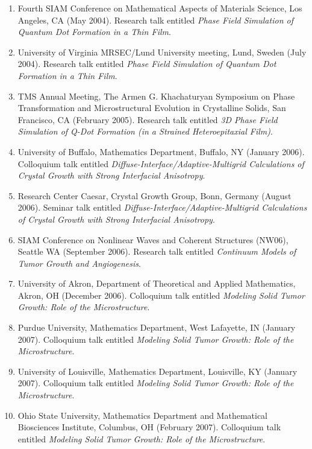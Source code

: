 \documentclass[10pt,letterpaper]{article}
\begin{document}
    \begin{enumerate}
    \item
Fourth SIAM Conference on Mathematical Aspects of Materials Science, Los Angeles, CA (May 2004). Research talk entitled {\sl Phase Field Simulation of Quantum Dot Formation in a Thin Film}.
    \item
University of Virginia MRSEC/Lund University meeting, Lund, Sweden (July 2004). Research talk entitled {\sl Phase Field Simulation of Quantum Dot Formation in a Thin Film}.
    \item
TMS Annual Meeting, The Armen G. Khachaturyan Symposium on Phase Transformation and Microstructural Evolution in Crystalline Solids, San Francisco, CA (February 2005).  Research talk entitled {\sl 3D Phase Field Simulation of Q-Dot Formation (in a Strained Heteroepitaxial Film)}.
    \item
University of Buffalo, Mathematics Department, Buffalo, NY (January 2006).  Colloquium talk entitled {\sl Diffuse-Interface/Adaptive-Multigrid Calculations of Crystal Growth with Strong Interfacial Anisotropy}.
    \item
Research Center Caesar, Crystal Growth Group, Bonn, Germany (August 2006).  Seminar talk entitled {\sl Diffuse-Interface/Adaptive-Multigrid Calculations of Crystal Growth with Strong Interfacial Anisotropy}.
    \item
SIAM Conference on Nonlinear Waves and Coherent Structures (NW06), Seattle WA (September 2006).  Research talk entitled {\sl Continuum Models of Tumor Growth and Angiogenesis}.
    \item
University of Akron, Department of Theoretical and Applied Mathematics, Akron, OH (December 2006).  Colloquium talk entitled {\sl Modeling Solid Tumor Growth: Role of the Microstructure}.
    \item
Purdue University, Mathematics Department, West Lafayette, IN (January 2007).  Colloquium talk entitled {\sl Modeling Solid Tumor Growth: Role of the Microstructure}.
    \item
University of Louisville, Mathematics Department, Louisville, KY (January 2007).  Colloquium talk entitled {\sl Modeling Solid Tumor Growth: Role of the Microstructure}.
    \item
Ohio State University, Mathematics Department and Mathematical Biosciences Institute, Columbus, OH (February 2007).  Colloquium talk entitled {\sl Modeling Solid Tumor Growth: Role of the Microstructure}.

\end{enumerate}
\end{document}

